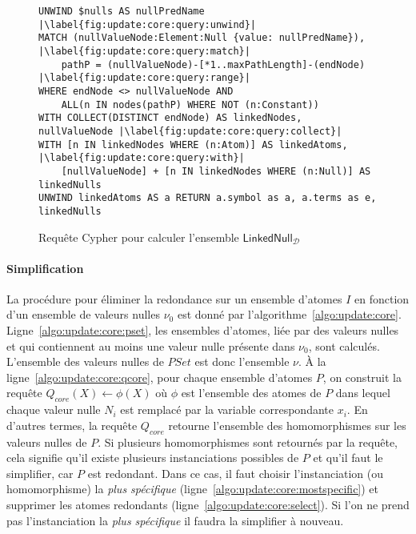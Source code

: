 \begin{figure}[htb]
	\begin{lstlisting}[escapechar=|]
UNWIND $nulls AS nullPredName |\label{fig:update:core:query:unwind}|
MATCH (nullValueNode:Element:Null {value: nullPredName}), |\label{fig:update:core:query:match}|
	pathP = (nullValueNode)-[*1..maxPathLength]-(endNode) |\label{fig:update:core:query:range}|
WHERE endNode <> nullValueNode AND
	ALL(n IN nodes(pathP) WHERE NOT (n:Constant))
WITH COLLECT(DISTINCT endNode) AS linkedNodes, nullValueNode |\label{fig:update:core:query:collect}|
WITH [n IN linkedNodes WHERE (n:Atom)] AS linkedAtoms, |\label{fig:update:core:query:with}|
	[nullValueNode] + [n IN linkedNodes WHERE (n:Null)] AS linkedNulls
UNWIND linkedAtoms AS a RETURN a.symbol as a, a.terms as e, linkedNulls
	\end{lstlisting}
	\caption{Requête Cypher pour calculer l'ensemble $\textsf{LinkedNull}_{\mathcal{D}}$}
	\label{fig:update:core:query}
\end{figure}

\begin{example}
	
\end{example}

\paragraph{Simplification}
La procédure pour éliminer la redondance sur un ensemble d'atomes $I$ en fonction d'un ensemble de valeurs nulles $\nu_0$ est donné par l'algorithme~\ref{algo:update:core}.
Ligne~\ref{algo:update:core:pset}, les ensembles d'atomes, liée par des valeurs nulles et qui contiennent au moins une valeur nulle présente dans $\nu_0$, sont calculés.
L'ensemble des valeurs nulles de $PSet$ est donc l'ensemble $\nu$.
À la ligne~\ref{algo:update:core:qcore}, pour chaque ensemble d'atomes $P$, on construit la requête $Q_{core}(X) \gets \phi(X)$ où $\phi$ est l'ensemble des atomes de $P$ dans lequel chaque valeur nulle $N_i$ est remplacé par la variable correspondante $x_i$.
En d'autres termes, la requête $Q_{core}$ retourne l'ensemble des homomorphismes sur les valeurs nulles de $P$.
Si plusieurs homomorphismes sont retournés par la requête, cela signifie qu'il existe plusieurs instanciations possibles de $P$ et qu'il faut le simplifier, car $P$ est redondant.
Dans ce cas, il faut choisir l'instanciation (ou homomorphisme) la \textit{plus spécifique} (ligne~\ref{algo:update:core:mostspecific}) et supprimer les atomes redondants (ligne~\ref{algo:update:core:select}).
Si l'on ne prend pas l'instanciation la \textit{plus spécifique} il faudra la simplifier à nouveau.

